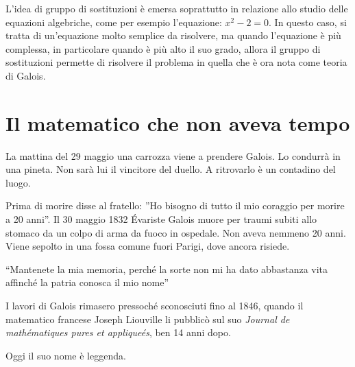 L’idea di gruppo di sostituzioni è emersa soprattutto in relazione allo studio delle equazioni algebriche, come per esempio l’equazione: $ x^2-2=0 $. In questo caso, si tratta di un’equazione molto semplice da risolvere, ma quando l’equazione è più complessa, in particolare quando è più alto il suo grado, allora il gruppo di sostituzioni permette di risolvere il problema in quella che è ora nota come teoria di Galois.

\section{Il matematico che non aveva tempo}

La mattina del 29 maggio una carrozza viene a prendere Galois. Lo condurrà in una pineta. Non sarà lui il vincitore del duello. A ritrovarlo è un contadino del luogo.

Prima di morire disse al fratello:
”Ho bisogno di tutto il mio coraggio per morire a 20 anni”. 
Il 30 maggio 1832 Évariste Galois muore per traumi subiti allo stomaco da un colpo di arma da fuoco in ospedale. Non aveva nemmeno 20 anni. Viene sepolto in una fossa comune fuori Parigi, dove ancora risiede.

“Mantenete la mia memoria, perché la sorte non mi ha dato abbastanza vita affinché la patria conosca il mio nome”

\medskip

I lavori di Galois rimasero pressoché sconosciuti fino al 1846, quando il matematico francese Joseph Liouville li pubblicò sul suo \emph{Journal de mathématiques pures et appliqueés}, ben 14 anni dopo.

\medskip

Oggi il suo nome è leggenda.
